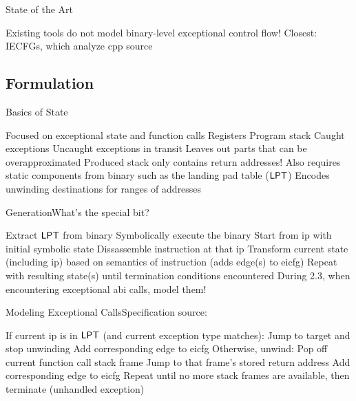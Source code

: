 \begin{frame}{State of the Art}
  \begin{outline}
    \1 Existing tools do not model binary-level exceptional control flow!
    \1 Closest: IECFGs, which analyze \gls{cpp} source
  \end{outline}
\end{frame}

\subsection{Formulation}
\begin{frame}{Basics of State}
  \begin{outline}
    \1 Focused on \alert{exceptional state} and \alert{function calls}
      \2 Registers
      \2 Program stack
      \2 \alert{Caught} exceptions
      \2 \alert{Uncaught} exceptions in transit
    \1 Leaves out parts that can be overapproximated
      \2 Produced stack only contains return addresses!
    \1 Also requires static components from binary such as the \alert{landing pad table ($\operatorname{\mathsf{LPT}}$)}
      \2 Encodes unwinding destinations for ranges of addresses
  \end{outline}
\end{frame}

\begin{frame}{Generation}{What's the special bit?}
  \begin{outline}[enumerate]
    \1<+-> Extract $\operatorname{\mathsf{LPT}}$ from binary
    \1<+-> \alert{Symbolically execute} the binary
      \2 Start from \gls{ip} with initial \alert{symbolic state}
      \2 Dissassemble instruction at that \gls{ip}
      \2 Transform current state (including \gls{ip}) based on semantics of instruction (adds edge(s) to \gls{eicfg})
      \2 Repeat with resulting state(s) until termination conditions encountered
    \1<+-> \alert{During 2.3, when encountering exceptional \gls{abi} calls, model them!}
  \end{outline}
\end{frame}

\begin{frame}{Modeling Exceptional  Calls}{Specification source: }
  \begin{block}{}
    \begin{outline}[enumerate]
      \1<+-> If current \gls{ip} is in $\operatorname{\mathsf{LPT}}$ (and current exception type matches):
        \2 Jump to target and stop unwinding
        \2 Add corresponding edge to \gls{eicfg}
      \1<+-> Otherwise, unwind:
        \2 Pop off current function call stack frame
        \2 Jump to that frame's stored return address
        \2 Add corresponding edge to \gls{eicfg}
      \1<+-> Repeat until no more stack frames are available, then terminate (\alert{unhandled exception})
    \end{outline}
  \end{block}
\end{frame}

